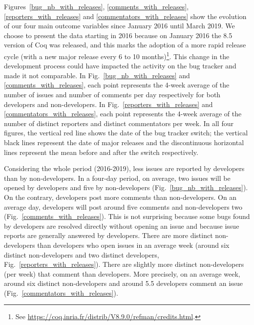 \documentclass[conference]{IEEEtran}
\begin{document}
Figures~\ref{bug_nb_with_releases}, \ref{comments_with_releases}, \ref{reporters_with_releases} and \ref{commentators_with_releases} show the evolution of our four main outcome variables since January 2016 until March 2019. We choose to present the data starting in 2016 because on January 2016 the 8.5 version of Coq was released, and this marks the adoption of a more rapid release cycle (with a new major release every 6 to 10 months)\footnote{See \url{https://coq.inria.fr/distrib/V8.9.0/refman/credits.html}.}. This change in the development process could have impacted the activity on the bug tracker and made it not comparable. In Fig.~\ref{bug_nb_with_releases} and \ref{comments_with_releases}, each point represents the 4-week average of the number of issues and number of comments per day respectively for both developers and non-developers. In Fig.~\ref{reporters_with_releases} and \ref{commentators_with_releases}, each point represents the 4-week average of the number of distinct reporters and distinct commentators per week. In all four figures, the vertical red line shows the date of the bug tracker switch; the vertical black lines represent the date of major releases and the discontinuous horizontal lines represent the mean before and after the switch respectively. 

Considering the whole period (2016-2019), less issues are reported by developers than by non-developers. In a four-day period, on average, two issues will be opened by developers and five by non-developers (Fig.~\ref{bug_nb_with_releases}). On the contrary, developers post more comments than non-developers. On an average day, developers will post around five comments and non-developers two (Fig.~\ref{comments_with_releases}). This is not surprising because some bugs found by developers are resolved directly without opening an issue and because issue reports are generally answered by developers.
There are more distinct non-developers than developers who open issues in an average week (around six distinct non-developers and two distinct developers, Fig.~\ref{reporters_with_releases}). There are slightly more distinct non-developers (per week) that comment than developers. More precisely, on an average week, around six distinct non-developers and around 5.5 developers comment an issue (Fig.~\ref{commentators_with_releases}). 
\end{document}
